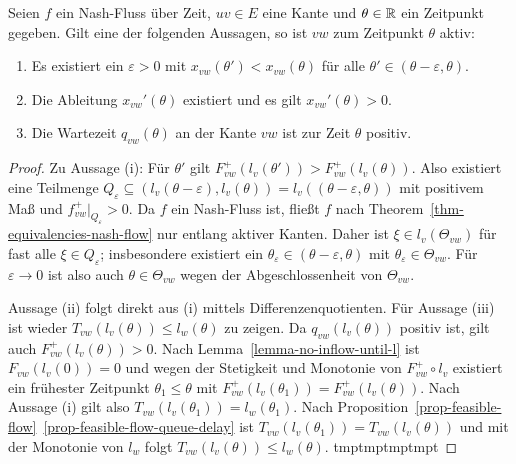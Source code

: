 \begin{lemma}\label{lemma-nash-flow-waiting-queue-implies-active-edge}
	Seien $f$ ein Nash-Fluss über Zeit, $uv\in E$ eine Kante und $\theta\in\mathbb{R}$ ein Zeitpunkt gegeben.
	Gilt eine der folgenden Aussagen, so ist $vw$ zum Zeitpunkt $\theta$ aktiv:
	\begin{enumerate}[label=(\roman*)]
		\item Es existiert ein $\varepsilon>0$ mit $x_{vw}(\theta')<x_{vw}(\theta)$ für alle $\theta'\in(\theta-\varepsilon, \theta)$.
		\item Die Ableitung $x_{vw}'(\theta)$ existiert und es gilt $x_{vw}'(\theta)> 0$.
		\item Die Wartezeit $q_{vw}(\theta)$ an der Kante $vw$ ist zur Zeit $\theta$ positiv.
	\end{enumerate}
\end{lemma}
\begin{proof}
	Zu Aussage (i): Für $\theta'$ gilt $F_{vw}^+(l_v(\theta')) > F_{vw}^+(l_v(\theta))$.
	Also existiert eine Teilmenge $Q_\varepsilon \subseteq (l_v(\theta-\varepsilon), l_v(\theta))=l_v((\theta - \varepsilon, \theta))$ mit positivem Maß und $f_{vw}^+\big|_{Q_\varepsilon} > 0$.
	Da $f$ ein Nash-Fluss ist, fließt $f$ nach Theorem~\ref{thm-equivalencies-nash-flow} nur entlang aktiver Kanten.
	Daher ist $\xi\in l_v(\Theta_{vw})$ für fast alle $\xi\in Q_\varepsilon$; insbesondere existiert ein $\theta_\varepsilon\in (\theta-\varepsilon, \theta)$ mit $\theta_\varepsilon\in\Theta_{vw}$.
	Für $\varepsilon\rightarrow0$ ist also auch $\theta\in\Theta_{vw}$ wegen der Abgeschlossenheit von $\Theta_{vw}$.
	
	Aussage (ii) folgt direkt aus (i) mittels Differenzenquotienten.
	Für Aussage (iii) ist wieder $T_{vw}(l_v(\theta)) \leq l_w(\theta)$ zu zeigen.
	Da $q_{vw}(l_v(\theta))$ positiv ist, gilt auch $F^+_{vw}(l_v(\theta)) > 0$.
	Nach Lemma~\ref{lemma-no-inflow-until-l} ist $F_{vw}(l_v(0))=0$ und wegen der Stetigkeit und Monotonie von $F_{vw}^+\circ l_v$ existiert
	ein frühester Zeitpunkt $\theta_1\leq\theta$ mit $F_{vw}^+(l_v(\theta_1)) = F_{vw}^+(l_v(\theta))$.
	Nach Aussage (i) gilt also $T_{vw}(l_v(\theta_1)) = l_w(\theta_1)$.
	Nach Proposition~\ref{prop-feasible-flow}~\ref{prop-feasible-flow-queue-delay} ist $T_{vw}(l_v(\theta_1)) = T_{vw}(l_v(\theta))$ und mit der Monotonie von $l_w$ folgt $T_{vw}(l_v(\theta))\leq l_w(\theta)$.	
	tmptmptmptmpt
\end{proof}

